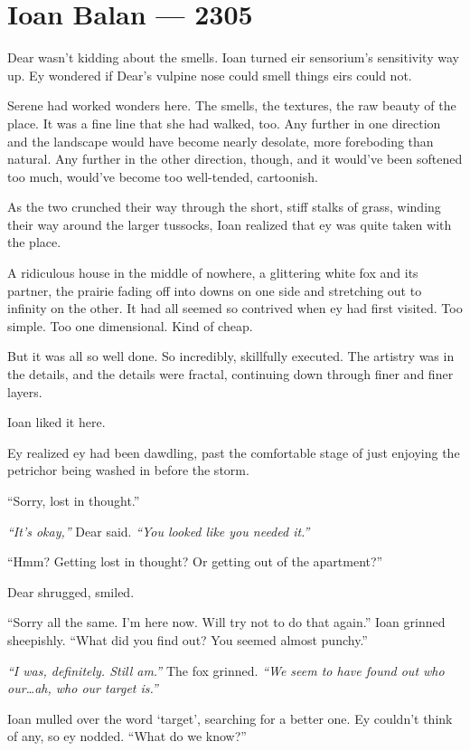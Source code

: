 \hypertarget{ioan-balan-2305}{%
\chapter*{Ioan Balan — 2305}\label{ioan-balan-2305}}

Dear wasn't kidding about the smells. Ioan turned eir sensorium's sensitivity way up. Ey wondered if Dear's vulpine nose could smell things eirs could not.

Serene had worked wonders here. The smells, the textures, the raw beauty of the place. It was a fine line that she had walked, too. Any further in one direction and the landscape would have become nearly desolate, more foreboding than natural. Any further in the other direction, though, and it would've been softened too much, would've become too well-tended, cartoonish.

As the two crunched their way through the short, stiff stalks of grass, winding their way around the larger tussocks, Ioan realized that ey was quite taken with the place.

A ridiculous house in the middle of nowhere, a glittering white fox and its partner, the prairie fading off into downs on one side and stretching out to infinity on the other. It had all seemed so contrived when ey had first visited. Too simple. Too one dimensional. Kind of cheap.

But it was all so well done. So incredibly, skillfully executed. The artistry was in the details, and the details were fractal, continuing down through finer and finer layers.

Ioan liked it here.

Ey realized ey had been dawdling, past the comfortable stage of just enjoying the petrichor being washed in before the storm.

``Sorry, lost in thought.''

\emph{``It's okay,''} Dear said. \emph{``You looked like you needed it.''}

``Hmm? Getting lost in thought? Or getting out of the apartment?''

Dear shrugged, smiled.

``Sorry all the same. I'm here now. Will try not to do that again.'' Ioan grinned sheepishly. ``What did you find out? You seemed almost punchy.''

\emph{``I was, definitely. Still am.''} The fox grinned. \emph{``We seem to have found out who our\ldots{}ah, who our target is.''}

Ioan mulled over the word `target', searching for a better one. Ey couldn't think of any, so ey nodded. ``What do we know?''

